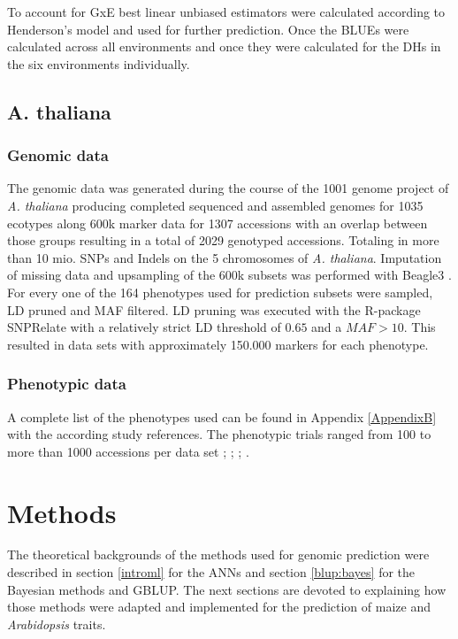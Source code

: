 To account for GxE best linear unbiased estimators were calculated according to
Henderson's model \cite{henderson1975best} and used for further prediction. Once the BLUEs
were calculated across all environments and once they were calculated for the DHs in the
six environments individually.



\subsection{A. thaliana}

\subsubsection{Genomic data}

The genomic data was generated during the course of the 1001 genome project of
\textit{A. thaliana} \cite{1001genome} producing completed sequenced and assembled genomes
for 1035 ecotypes along 600k marker data for 1307 accessions with an overlap between those
groups resulting in a total of 2029 genotyped accessions. Totaling in more than 10
mio. SNPs and Indels on the 5 chromosomes of \textit{A. thaliana}. Imputation of missing
data and upsampling of the 600k subsets was performed with Beagle3
\cite{browning2007rapid}. \\
For every one of the 164 phenotypes used for prediction subsets were sampled, LD pruned
and MAF filtered. LD pruning was executed with the R-package SNPRelate
\cite{zheng2013tutorial} with a relatively strict LD threshold of $0.65$ and a
$MAF > 10 $. This resulted in data sets with approximately 150.000 markers for each
phenotype.

\subsubsection{Phenotypic data}
A complete list of the phenotypes used can be found in Appendix \ref{AppendixB} with the
according study references. The phenotypic trials ranged from 100 to more than 1000
accessions per data set \cite{atwell2010}; \cite{li2010}; \cite{me2014}; \cite{strauch2015}.

\section{Methods}

The theoretical backgrounds of the methods used for genomic prediction were described in
section \ref{introml} for the ANNs and section \ref{blup:bayes} for the Bayesian methods
and GBLUP. The next sections are devoted to explaining how those methods were adapted and
implemented for the prediction of maize and \textit{Arabidopsis} traits.

